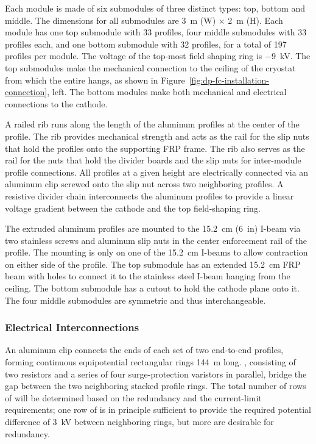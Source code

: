 Each  module is made of six submodules of three distinct types: top, bottom and middle. The dimensions for all submodules are \SI{3}{\m} (W) $\times$ \SI{2}{\m} (H).
Each module has one top submodule with \num{33} profiles, four middle submodules with \num{33} profiles each, and one bottom submodule with \num{32} profiles, for a total of \num{197} profiles per module. The voltage of the top-most field shaping ring  is \SI{-9}{\kV}. 
The top submodules make the mechanical connection to the ceiling of the cryostat from which the entire  hangs, as shown in Figure~\ref{fig:dp-fc-installation-connection}, left. The bottom modules make both mechanical and electrical connections to the cathode. 


A railed rib runs along the length of the aluminum profiles at the center of the profile.  The rib provides mechanical strength and acts as the rail for the slip nuts that hold the profiles onto the supporting FRP frame. The rib also serves as the rail for the nuts that hold the  divider boards and the slip nuts for inter-module profile connections.  
All profiles at a given height are electrically connected via an aluminum clip screwed onto the slip nut across two neighboring profiles.  A resistive divider chain interconnects the aluminum profiles to provide a linear voltage gradient between the cathode and the top field-shaping ring.   


The extruded aluminum profiles are mounted to the \SI{15.2}{\cm} (\SI{6}{in}) I-beam via two stainless screws and aluminum slip nuts in the center enforcement rail of the profile. The mounting is only on one of the \SI{15.2}{\cm} I-beams to allow contraction on either side of the profile. The top submodule has an extended \SI{15.2}{\cm} FRP beam with holes to connect it to the stainless steel I-beam hanging from the ceiling.  The bottom submodule has a cutout to hold the cathode plane onto it. The four middle submodules are symmetric and thus interchangeable.


\subsubsection{Electrical Interconnections}

An aluminum clip connects the ends of each set of two end-to-end  profiles, forming continuous equipotential rectangular rings  \SI{144}{\m} long. 
, consisting of two resistors and a series of four surge-protection varistors in parallel, bridge the gap between the two neighboring stacked profile rings.   The total number of rows of  will be determined based on the redundancy and the current-limit requirements;  one row of  is in principle sufficient to provide the required potential difference of \SI{3}{\kV} between neighboring rings, but more are desirable for redundancy.


